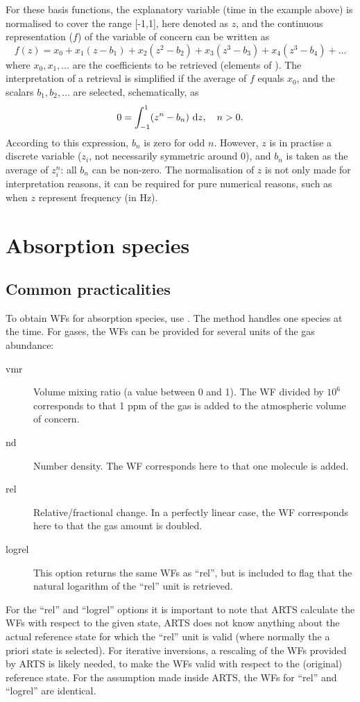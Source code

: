 For these basis functions, the explanatory variable (time in the example above)
is normalised to cover the range [-1,1], here denoted as $z$, and the
continuous representation ($f$) of the variable of concern can be written as
\begin{equation}
  f(z) = x_0 + x_1(z-b_1) + x_2(z^2-b_2) + x_3(z^3-b_3) + x_4(z^3-b_4) + \dots  
\end{equation}
where $x_0, x_1, \dots$ are the coefficients to be retrieved (elements of
\SttVct). The interpretation of a retrieval is simplified if the average of $f$
equals $x_0$, and the scalars $b_1, b_2, \dots$ are selected, schematically, as
\begin{equation}
  0 = \int_{-1}^1 \!\left(z^n-b_n\right) \, \mathrm{d} z, \quad n>0.
\end{equation}
According to this expression, $b_n$ is zero for odd $n$. However, $z$ is in
practise a discrete variable ($z_i$, not necessarily symmetric around 0), and
$b_n$ is taken as the average of $z_i^n$: all $b_n$ can be non-zero. The
normalisation of $z$ is not only made for interpretation reasons, it can be
required for pure numerical reasons, such as when $z$ represent frequency (in
Hz).




\section{Absorption species}
\label{sec:wfuns:absspecies}


\subsection{Common practicalities}
%
To obtain WFs for absorption species, use . The
method handles one species at the time. For gases, the WFs can be provided for
several units of the gas abundance:
\begin{description}
\item[vmr] Volume mixing ratio (a value between 0 and 1). The WF divided by
  $10^6$ corresponds to that 1 ppm of the gas is added to the atmospheric
  volume of concern.
\item[nd] Number density. The WF corresponds here to that one molecule is added.
\item[rel] Relative/fractional change. In a perfectly linear case, the WF
  corresponds here to that the gas amount is doubled.
\item[logrel] This option returns the same WFs as ``rel'', but is included to
  flag that the natural logarithm of the ``rel'' unit is retrieved.
\end{description}
For the ``rel'' and ``logrel'' options it is important to note that ARTS
calculate the WFs with respect to the given state, ARTS does not know anything
about the actual reference state for which the ``rel'' unit is valid (where
normally the a priori state is selected). For iterative inversions, a rescaling
of the WFs provided by ARTS is likely needed, to make the WFs valid with
respect to the (original) reference state. For the assumption made inside ARTS,
the WFs for ``rel'' and ``logrel'' are identical.


